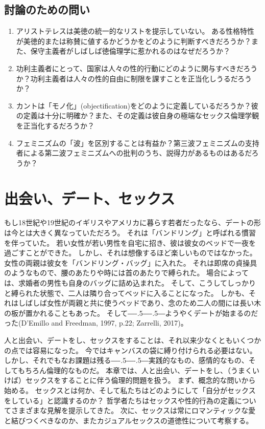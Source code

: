 \documentclass[paper=a4,book,openany]{jlreq}
\def\DDASH{―\kern-.5\zw―\kern-.5\zw―} %
\begin{document}
\section{討論のための問い}
\begin{enumerate}
\item アリストテレスは美徳の統一的なリストを提示していない。
ある性格特性が美徳的または称賛に値するかどうかをどのように判断すべきだろうか？また、保守主義者がしばしば徳倫理学に惹かれるのはなぜだろうか？

    \item 功利主義者にとって、国家は人々の性的行動にどのように関与すべきだろうか？功利主義者は人々の性的自由に制限を課すことを正当化しうるだろうか？

    \item カントは「モノ化」(objectification)をどのように定義しているだろうか？彼の定義は十分に明確か？また、その定義は彼自身の極端なセックス倫理学観を正当化するだろうか？

    \item フェミニズムの「波」を区別することは有益か？第三波フェミニズムの支持者による第二波フェミニズムへの批判のうち、説得力があるものはあるだろうか？
\end{enumerate}

\chapter{出会い、デート、セックス}

もし18世紀や19世紀のイギリスやアメリカに暮らす若者だったなら、デートの形は今とは大きく異なっていただろう。
それは「バンドリング」と呼ばれる慣習を伴っていた。
若い女性が若い男性を自宅に招き、彼は彼女のベッドで一夜を過ごすことができた。
しかし、それは想像するほど楽しいものではなかった。
女性の両親は彼女を「バンドリング・バッグ」に入れた。
それは即席の貞操具のようなもので、腰のあたりや時には首のあたりで縛られた。
場合によっては、求婚者の男性も自身のバッグに詰め込まれた。
そして、こうしてしっかりと縛られた状態で、二人は隣り合ってベッドに入ることになった。
しかも、それはしばしば女性が両親と共に使うベッドであり、念のため二人の間には長い木の板が置かれることもあった。
そして{\DDASH}ようやくデートが始まるのだった(D'Emillo and Freedman, 1997, p.22; Zarrelli, 2017)。

\nocite{demilio97:_intim_matter}\nocite{zarrelli17:_awkwar_centur_datin}

人と出会い、デートをし、セックスをすることは、それ以来少なくともいくつかの点では容易になった。
今ではキャンバスの袋に縛り付けられる必要はない。
しかし、それでもなお課題は残る{\DDASH}実践的なもの、感情的なもの、そしてもちろん倫理的なものだ。
本章では、人と出会い、デートをし、（うまくいけば）セックスをすることに伴う倫理的問題を扱う。
まず、概念的な問いから始める。
セックスとは何か、そして私たちはどのようにして「自分がセックスをしている」と認識するのか？ 哲学者たちはセックスや性的行為の定義についてさまざまな見解を提示してきた。
次に、セックスは常にロマンティックな愛と結びつくべきなのか、またカジュアルセックスの道徳性について考察する。
\end{document}
